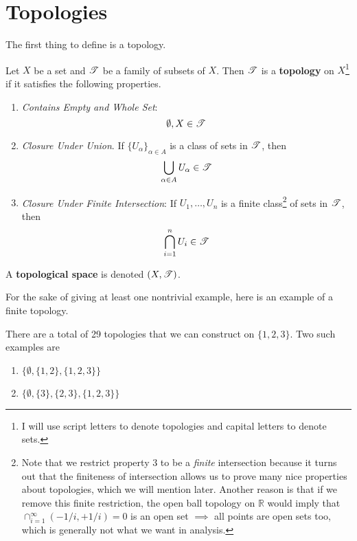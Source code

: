 \section{Topologies} 

  The first thing to define is a topology. 

  \begin{definition}[Topology]
    Let $X$ be a set and $\T$ be a family of subsets of $X$. Then $\T$ is a \textbf{topology} on $X$\footnote{I will use script letters to denote topologies and capital letters to denote sets.} if it satisfies the following properties. 
    \begin{enumerate}
      \item \textit{Contains Empty and Whole Set}: 
      \begin{equation}
        \emptyset, X \in \T
      \end{equation}

      \item \textit{Closure Under Union}. If $\{U_\alpha\}_{\alpha \in A}$ is a class of sets in $\T$, then 
      \begin{equation}
        \bigcup_{\alpha \in A} U_\alpha \in \T
      \end{equation}

      \item \textit{Closure Under Finite Intersection}: If $U_1, \ldots, U_n$ is a finite class\footnote{Note that we restrict property 3 to be a \textit{finite} intersection because it turns out that the finiteness of intersection allows us to prove many nice properties about topologies, which we will mention later. Another reason is that if we remove this finite restriction, the open ball topology on $\mathbb{R}$ would imply that $\cap_{i = 1}^{\infty} ( - 1/i, +1/i ) = 0$ is an open set $\implies$ all points are open sets too, which is generally not what we want in analysis. 
      } of sets in $\T$, then 
      \begin{equation}
       \bigcap_{i=1}^{n} U_i \in \T
      \end{equation}
    \end{enumerate}
    A \textbf{topological space} is denoted $(X, \T)$. 
  \end{definition}

  For the sake of giving at least one nontrivial example, here is an example of a finite topology. 

  \begin{example}
    There are a total of 29 topologies that we can construct on $\{1, 2, 3\}$. Two such examples are 
    \begin{enumerate}
      \item $\{\emptyset, \{1, 2\}, \{1, 2, 3\}\}$ 
      \item $\{\emptyset, \{3\}, \{2, 3\}, \{1, 2, 3\}\}$
    \end{enumerate}
  \end{example} 

